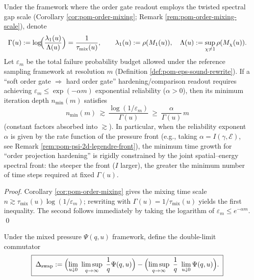 \begin{corollary}\label{cor:pom-pressure-delay-lower-bound}
Under the framework where the order gate readout employs the twisted spectral gap scale (Corollary \ref{cor:pom-order-mixing}; Remark \ref{rem:pom-order-mixing-scale}), denote
\[
\Gamma(u)
:=
\log\!\Bigl(\frac{\lambda_1(u)}{\Lambda(u)}\Bigr)
=\frac{1}{\tau_{\mathrm{mix}}(u)},
\qquad
\lambda_1(u):=\rho(M_1(u)),\quad
\Lambda(u):=\sup_{\chi\neq 1}\rho(M_\chi(u)).
\]
Let \(\varepsilon_m\) be the total failure probability budget allowed under the reference sampling framework at resolution \(m\) (Definition \ref{def:pom-eps-sound-rewrite}).
If a ``soft order gate \(\Rightarrow\) hard order gate'' hardening/comparison readout requires achieving
\(
\varepsilon_m\le \exp(-\alpha m)
\)
exponential reliability (\(\alpha>0\)), then its minimum iteration depth \(n_{\min}(m)\) satisfies
\[
\boxed{\;
n_{\min}(m)\ \gtrsim\ \frac{\log(1/\varepsilon_m)}{\Gamma(u)}\ \ge\ \frac{\alpha}{\Gamma(u)}\,m\;}
\]
(constant factors absorbed into \(\gtrsim\)).
In particular, when the reliability exponent \(\alpha\) is given by the rate function of the pressure front (e.g., taking \(\alpha=I(\gamma,\mathcal{E})\), see Remark \ref{rem:pom-psi-2d-legendre-front}), the minimum time growth for ``order projection hardening'' is rigidly constrained by the joint spatial--energy spectral front: the steeper the front (\(I\) larger), the greater the minimum number of time steps required at fixed \(\Gamma(u)\).
\end{corollary}
\begin{proof}
Corollary \ref{cor:pom-order-mixing} gives the mixing time scale
\(
n\gtrsim \tau_{\mathrm{mix}}(u)\log(1/\varepsilon_m)
\);
rewriting with \(\Gamma(u)=1/\tau_{\mathrm{mix}}(u)\) yields the first inequality.
The second follows immediately by taking the logarithm of \(\varepsilon_m\le e^{-\alpha m}\). \qed
\end{proof}

\begin{definition}\label{def:pom-hard-tail-swap-anomaly}
Under the mixed pressure \(\Psi(q,u)\) framework, define the double-limit commutator
\[
\boxed{\;
\Delta_{\mathrm{swap}}
:=
\Bigl(\lim_{u\downarrow 0}\ \limsup_{q\to\infty}\ \frac{1}{q}\Psi(q,u)\Bigr)
-
\Bigl(\limsup_{q\to\infty}\ \frac{1}{q}\ \lim_{u\downarrow 0}\Psi(q,u)\Bigr).\;}
\]
\end{definition}

